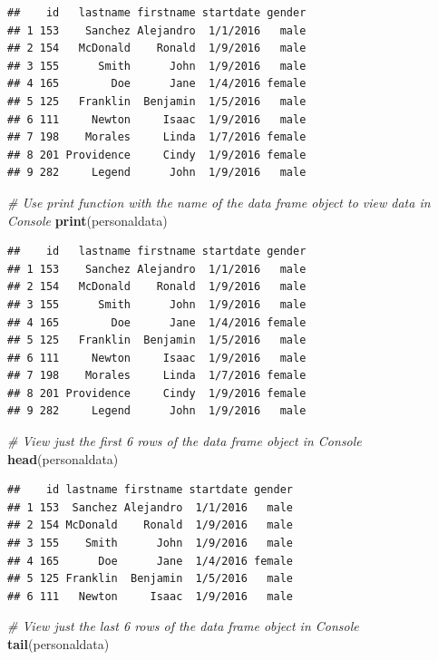 \documentclass[]{book}
\newenvironment{Shaded}{\begin{snugshade}}{\end{snugshade}}
\newcommand{\KeywordTok}[1]{\textcolor[rgb]{0.13,0.29,0.53}{\textbf{#1}}}
\newcommand{\CommentTok}[1]{\textcolor[rgb]{0.56,0.35,0.01}{\textit{#1}}}
\newcommand{\NormalTok}[1]{#1}
\begin{document}
\begin{verbatim}
##    id   lastname firstname startdate gender
## 1 153    Sanchez Alejandro  1/1/2016   male
## 2 154   McDonald    Ronald  1/9/2016   male
## 3 155      Smith      John  1/9/2016   male
## 4 165        Doe      Jane  1/4/2016 female
## 5 125   Franklin  Benjamin  1/5/2016   male
## 6 111     Newton     Isaac  1/9/2016   male
## 7 198    Morales     Linda  1/7/2016 female
## 8 201 Providence     Cindy  1/9/2016 female
## 9 282     Legend      John  1/9/2016   male
\end{verbatim}

\begin{Shaded}
\begin{Highlighting}[]
\CommentTok{# Use print function with the name of the data frame object to view data in Console}
\KeywordTok{print}\NormalTok{(personaldata)}
\end{Highlighting}
\end{Shaded}

\begin{verbatim}
##    id   lastname firstname startdate gender
## 1 153    Sanchez Alejandro  1/1/2016   male
## 2 154   McDonald    Ronald  1/9/2016   male
## 3 155      Smith      John  1/9/2016   male
## 4 165        Doe      Jane  1/4/2016 female
## 5 125   Franklin  Benjamin  1/5/2016   male
## 6 111     Newton     Isaac  1/9/2016   male
## 7 198    Morales     Linda  1/7/2016 female
## 8 201 Providence     Cindy  1/9/2016 female
## 9 282     Legend      John  1/9/2016   male
\end{verbatim}

\begin{Shaded}
\begin{Highlighting}[]
\CommentTok{# View just the first 6 rows of the data frame object in Console}
\KeywordTok{head}\NormalTok{(personaldata)}
\end{Highlighting}
\end{Shaded}

\begin{verbatim}
##    id lastname firstname startdate gender
## 1 153  Sanchez Alejandro  1/1/2016   male
## 2 154 McDonald    Ronald  1/9/2016   male
## 3 155    Smith      John  1/9/2016   male
## 4 165      Doe      Jane  1/4/2016 female
## 5 125 Franklin  Benjamin  1/5/2016   male
## 6 111   Newton     Isaac  1/9/2016   male
\end{verbatim}

\begin{Shaded}
\begin{Highlighting}[]
\CommentTok{# View just the last 6 rows of the data frame object in Console}
\KeywordTok{tail}\NormalTok{(personaldata)}
\end{Highlighting}
\end{Shaded}
\end{document}
